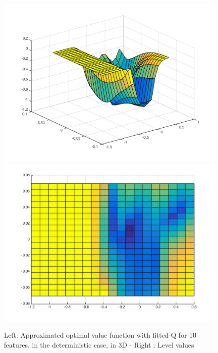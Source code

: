 \documentclass[a4paper, 12pt]{article}
\begin{document}
\begin{figure}[H]
	\centering
	\noindent\includegraphics[scale=0.3]{fittedQ-10feat-determ.png}
	\noindent\includegraphics[scale=0.3]{fittedQ-10feat-determ-flat.png}
	\caption{Left: Approximated optimal value function with fitted-Q for 10 features, in the deterministic case, in 3D - Right : Level values}
\end{figure}
\end{document}
